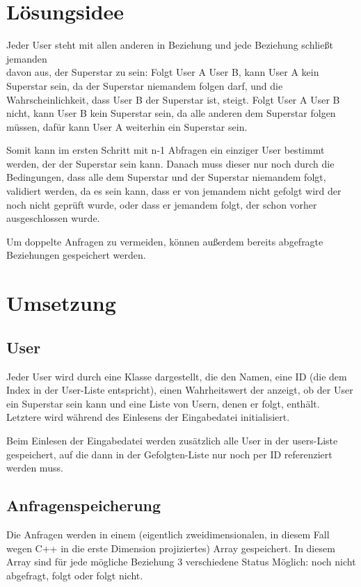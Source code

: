 \documentclass[a4paper,10pt,ngerman]{scrartcl}
\title{\Aufgabe}
\author{\Name\\Team-ID: \TeamId}
\date{\today}
\begin{document}
\maketitle
\vspace{7\baselineskip}
\tableofcontents
\pagebreak

\section{Lösungsidee}
Jeder User steht mit allen anderen in Beziehung und jede Beziehung schließt jemanden \\ davon aus, der Superstar zu sein: Folgt User A User B, kann User A kein Superstar sein, da der Superstar niemandem folgen darf, und die Wahrscheinlichkeit, dass User B der Superstar ist, steigt. Folgt User A User B nicht, kann User B kein Superstar sein, da alle anderen dem Superstar folgen müssen, dafür kann User A weiterhin ein Superstar sein.

Somit kann im ersten Schritt mit n-1 Abfragen ein einziger User bestimmt werden, der der Superstar sein kann. Danach muss dieser nur noch durch die Bedingungen, dass alle dem Superstar und der Superstar niemandem folgt, validiert werden, da es sein kann, dass er von jemandem nicht gefolgt wird der noch nicht geprüft wurde, oder dass er jemandem folgt, der schon vorher ausgeschlossen wurde.

Um doppelte Anfragen zu vermeiden, können außerdem bereits abgefragte Beziehungen gespeichert werden.

\pagebreak
\section{Umsetzung}

\subsection{User}
Jeder User wird durch eine Klasse dargestellt, die den Namen, eine ID (die dem Index in der User-Liste entspricht), einen Wahrheitswert der anzeigt, ob der User ein Superstar sein kann und eine Liste von Usern, denen er folgt, enthält. Letztere wird während des Einlesens der Eingabedatei initialisiert.

Beim Einlesen der Eingabedatei werden zusätzlich alle User in der users-Liste gespeichert, auf die dann in der Gefolgten-Liste nur noch per ID referenziert werden muss.

\subsection{Anfragenspeicherung}
Die Anfragen werden in einem (eigentlich zweidimensionalen, in diesem Fall wegen C++ in die erste Dimension projiziertes) Array gespeichert. In diesem Array sind für jede mögliche Beziehung 3 verschiedene Status Möglich: noch nicht abgefragt, folgt oder folgt nicht.
\end{document}
